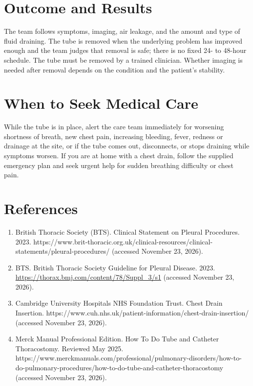 \section*{Outcome and Results}
The team follows symptoms, imaging, air leakage, and the amount and type of fluid draining. The tube is removed when the underlying problem has improved enough and the team judges that removal is safe; there is no fixed 24- to 48-hour schedule. The tube must be removed by a trained clinician. Whether imaging is needed after removal depends on the condition and the patient's stability.

\section*{When to Seek Medical Care}
While the tube is in place, alert the care team immediately for worsening shortness of breath, new chest pain, increasing bleeding, fever, redness or drainage at the site, or if the tube comes out, disconnects, or stops draining while symptoms worsen. If you are at home with a chest drain, follow the supplied emergency plan and seek urgent help for sudden breathing difficulty or chest pain.

\section*{References}
\begin{enumerate}
  \item British Thoracic Society (BTS). Clinical Statement on Pleural Procedures. 2023. https://www.brit-thoracic.org.uk/clinical-resources/clinical-statements/pleural-procedures/ (accessed November 23, 2026).
  \item BTS. British Thoracic Society Guideline for Pleural Disease. 2023. \url{https://thorax.bmj.com/content/78/Suppl_3/s1} (accessed November 23, 2026).
  \item Cambridge University Hospitals NHS Foundation Trust. Chest Drain Insertion. https://www.cuh.nhs.uk/patient-information/chest-drain-insertion/ (accessed November 23, 2026).
  \item Merck Manual Professional Edition. How To Do Tube and Catheter Thoracostomy. Reviewed May 2025. https://www.merckmanuals.com/professional/pulmonary-disorders/how-to-do-pulmonary-procedures/how-to-do-tube-and-catheter-thoracostomy (accessed November 23, 2026).
\end{enumerate}

\clearpage
